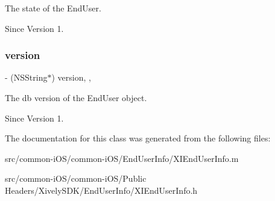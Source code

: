 The state of the End\+User. 

\begin{DoxySince}{Since}
Version 1. 
\end{DoxySince}
\hypertarget{class_x_i_end_user_info_a7102ce0a22f4680c5c9eb895fa4386aa}{}\label{class_x_i_end_user_info_a7102ce0a22f4680c5c9eb895fa4386aa} 
\subsubsection{\texorpdfstring{version}{version}}
{\footnotesize\ttfamily -\/ (N\+S\+String$\ast$) version\hspace{0.3cm}{\ttfamily [read]}, {\ttfamily [nonatomic]}, {\ttfamily [assign]}}



The db version of the End\+User object. 

\begin{DoxySince}{Since}
Version 1. 
\end{DoxySince}


The documentation for this class was generated from the following files\+:\begin{DoxyCompactItemize}
\item 
src/common-\/i\+O\+S/common-\/i\+O\+S/\+End\+User\+Info/X\+I\+End\+User\+Info.\+m\item 
src/common-\/i\+O\+S/common-\/i\+O\+S/\+Public Headers/\+Xively\+S\+D\+K/\+End\+User\+Info/X\+I\+End\+User\+Info.\+h\end{DoxyCompactItemize}
